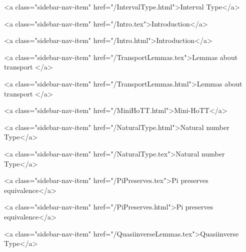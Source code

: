       
    
      
        
          <a class="sidebar-nav-item" href="/IntervalType.html">Interval Type</a>
        
      
    
      
        
          <a class="sidebar-nav-item" href="/Intro.tex">Introduction</a>
        
      
    
      
        
          <a class="sidebar-nav-item" href="/Intro.html">Introduction</a>
        
      
    
      
        
          <a class="sidebar-nav-item" href="/TransportLemmas.tex">Lemmas about transport </a>
        
      
    
      
        
          <a class="sidebar-nav-item" href="/TransportLemmas.html">Lemmas about transport </a>
        
      
    
      
        
          <a class="sidebar-nav-item" href="/MiniHoTT.html">Mini-HoTT</a>
        
      
    
      
        
          <a class="sidebar-nav-item" href="/NaturalType.html">Natural number Type</a>
        
      
    
      
        
          <a class="sidebar-nav-item" href="/NaturalType.tex">Natural number Type</a>
        
      
    
      
        
          <a class="sidebar-nav-item" href="/PiPreserves.tex">Pi preserves equivalence</a>
        
      
    
      
        
          <a class="sidebar-nav-item" href="/PiPreserves.html">Pi preserves equivalence</a>
        
      
    
      
        
          <a class="sidebar-nav-item" href="/QuasiinverseLemmas.tex">Quasiinverse Type</a>
        
